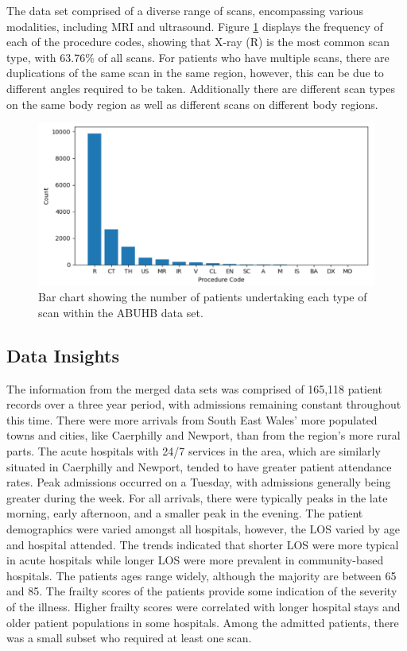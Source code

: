 \documentclass[../thesis.tex]{subfiles}
\begin{document}
The data set comprised of a diverse range of scans, encompassing various modalities, including MRI and ultrasound. Figure \ref{fig:procedure} displays the frequency of each of the procedure codes, showing that X-ray (R) is the most common scan type, with 63.76\% of all scans. For patients who have multiple scans, there are duplications of the same scan in the same region, however, this can be due to different angles required to be taken. Additionally there are different scan types on the same body region as well as different scans on different body regions.
\begin{figure}[h!]
    \centering
    \includegraphics[scale=0.75]{Chapters/Chapter5/Figures/Procedure Code.png}
    \caption{Bar chart showing the number of patients undertaking each type of scan within the ABUHB data set.}
    \label{fig:procedure}
\end{figure}
\subsection{Data Insights}
The information from the merged data sets was comprised of 165,118 patient records over a three year period, with admissions remaining constant throughout this time. There were more arrivals from South East Wales' more populated towns and cities, like Caerphilly and Newport, than from the region's more rural parts. The acute hospitals with 24/7 services in the area, which are similarly situated in Caerphilly and Newport, tended to have greater patient attendance rates. Peak admissions occurred on a Tuesday, with admissions generally being greater during the week. For all arrivals, there were typically peaks in the late morning, early afternoon, and a smaller peak in the evening. The patient demographics were varied amongst all hospitals, however, the LOS varied by age and hospital attended. The trends indicated that shorter LOS were more typical in acute hospitals while longer LOS were more prevalent in community-based hospitals. The patients ages range widely, although the majority are between 65 and 85. The frailty scores of the patients provide some indication of the severity of the illness. Higher frailty scores were correlated with longer hospital stays and older patient populations in some hospitals. Among the admitted patients, there was a small subset who required at least one scan.
\end{document}
